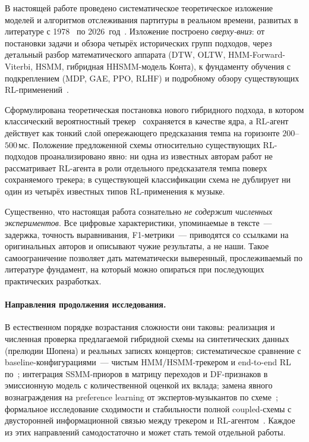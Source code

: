 %
В настоящей работе проведено систематическое теоретическое
изложение моделей и алгоритмов отслеживания партитуры в
реальном времени, развитых в литературе с 1978~\cite{SakoeChiba1978}
по 2026~год~\cite{Kim2026LiveAgents}. Изложение построено
\textit{сверху-вниз}: от постановки задачи и обзора четырёх
исторических групп подходов, через детальный разбор
математического аппарата (DTW, OLTW, HMM-Forward-Viterbi,
HSMM, гибридная HHSMM-модель Конта), к фундаменту обучения с
подкреплением (MDP, GAE, PPO, RLHF) и подробному обзору
существующих RL-применений~\cite{Dorfer2018RL,Peter2023,
Jiang2020RLDuet,Wu2024ReaLchords,Jaques2017SeqTutor}.

Сформулирована теоретическая постановка нового гибридного
подхода, в котором классический вероятностный
трекер~\cite{Cont2010} сохраняется в качестве ядра, а
RL-агент действует как тонкий слой опережающего предсказания
темпа на горизонте $200$--$500$\,мс. Положение предложенной
схемы относительно существующих RL-подходов проанализировано
явно: ни одна из известных авторам работ не рассматривает
RL-агента в роли отдельного предсказателя темпа поверх
сохраняемого трекера; в существующей классификации схема не
дублирует ни один из четырёх известных типов RL-применения к
музыке.

Существенно, что настоящая работа сознательно \textit{не
содержит численных экспериментов}. Все цифровые характеристики,
упоминаемые в тексте~--- задержка, точность выравнивания,
F1-метрики~--- приводятся со ссылками на оригинальных авторов и
описывают чужие результаты, а не наши. Такое самоограничение
позволяет дать математически выверенный, прослеживаемый по
литературе фундамент, на который можно опираться при
последующих практических разработках.

\paragraph*{Направления продолжения исследования.} В естественном
порядке возрастания сложности они таковы: реализация и численная
проверка предлагаемой гибридной схемы на синтетических данных
(прелюдии Шопена) и реальных записях концертов; систематическое
сравнение с baseline-конфигурациями~--- чистым HMM/HSMM-трекером
и end-to-end RL по~\cite{Dorfer2018RL,Peter2023}; интеграция
SSMM-приоров в матрицу переходов и DF-признаков в эмиссионную
модель с количественной оценкой их вклада; замена явного
вознаграждения на preference learning от экспертов-музыкантов
по схеме~\cite{Christiano2017Preference}; формальное исследование
сходимости и стабильности полной coupled-схемы с двусторонней
информационной связью между трекером и
RL-агентом~\cite{Cont2010}. Каждое из этих направлений
самодостаточно и может стать темой отдельной работы.

